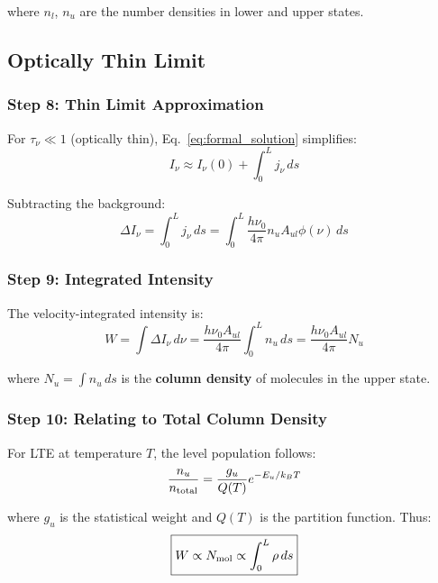 \documentclass[twocolumn,amsmath,amssymb,prd,superscriptaddress,nofootinbib]{revtex4-2}
\begin{document}
where $n_l$, $n_u$ are the number densities in lower and upper states.

\subsection{Optically Thin Limit}

\subsubsection{Step 8: Thin Limit Approximation}

For $\tau_\nu \ll 1$ (optically thin), Eq.~\eqref{eq:formal_solution} simplifies:
\begin{equation}
    I_\nu \approx I_\nu(0) + \int_0^L j_\nu \, ds
    \label{eq:thin_limit}
\end{equation}

Subtracting the background:
\begin{equation}
    \Delta I_\nu = \int_0^L j_\nu \, ds = \int_0^L \frac{h\nu_0}{4\pi} n_u A_{ul} \phi(\nu) \, ds
\end{equation}

\subsubsection{Step 9: Integrated Intensity}

The velocity-integrated intensity is:
\begin{equation}
    W = \int \Delta I_\nu \, d\nu = \frac{h\nu_0 A_{ul}}{4\pi} \int_0^L n_u \, ds = \frac{h\nu_0 A_{ul}}{4\pi} N_u
    \label{eq:integrated_intensity}
\end{equation}

where $N_u = \int n_u \, ds$ is the \textbf{column density} of molecules in the upper state.

\subsubsection{Step 10: Relating to Total Column Density}

For LTE at temperature $T$, the level population follows:
\begin{equation}
    \frac{n_u}{n_{\rm total}} = \frac{g_u}{Q(T)} e^{-E_u/k_BT}
\end{equation}

where $g_u$ is the statistical weight and $Q(T)$ is the partition function. Thus:
\begin{equation}
    \boxed{W \propto N_{\rm mol} \propto \int_0^L \rho \, ds}
    \label{eq:W_column}
\end{equation}
\end{document}
